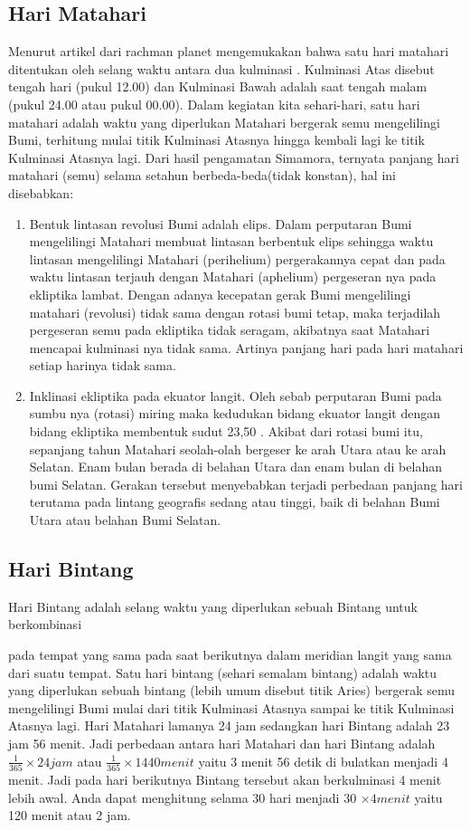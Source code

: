\subsection{Hari Matahari}
 Menurut artikel dari rachman planet mengemukakan bahwa satu hari matahari ditentukan
 oleh selang waktu antara dua kulminasi \cite{rachmanplanet}. Kulminasi Atas disebut tengah hari (pukul 12.00)
 dan Kulminasi Bawah adalah saat tengah malam (pukul 24.00 atau pukul 00.00). 
 Dalam kegiatan kita sehari-hari, satu hari matahari adalah waktu yang diperlukan
 Matahari bergerak semu mengelilingi Bumi, terhitung mulai titik Kulminasi Atasnya
 hingga kembali lagi ke titik Kulminasi Atasnya lagi. Dari hasil pengamatan Simamora, ternyata 
 panjang hari matahari (semu) selama setahun berbeda-beda(tidak konstan), 
 hal ini disebabkan:
 \begin{enumerate}
 \item Bentuk lintasan revolusi Bumi adalah elips.
 Dalam perputaran Bumi mengelilingi Matahari membuat lintasan berbentuk elips 
 sehingga waktu lintasan mengelilingi Matahari (perihelium) 
 pergerakannya cepat dan pada waktu lintasan terjauh 
 dengan Matahari (aphelium) pergeseran nya pada ekliptika lambat. 
 Dengan adanya kecepatan gerak Bumi mengelilingi matahari (revolusi)
 tidak sama dengan rotasi bumi tetap, maka terjadilah pergeseran semu
 pada ekliptika tidak seragam, akibatnya saat Matahari mencapai 
 kulminasi nya tidak sama. Artinya panjang hari pada hari matahari 
 setiap harinya tidak sama.
 
 \item	Inklinasi ekliptika pada ekuator langit.
 Oleh sebab perputaran Bumi pada sumbu nya (rotasi) miring maka kedudukan
 bidang ekuator langit dengan bidang ekliptika membentuk sudut 23,50 .
 Akibat dari rotasi bumi itu, sepanjang tahun Matahari seolah-olah bergeser ke arah
 Utara atau ke arah Selatan. Enam bulan berada di belahan Utara dan 
 enam bulan di belahan bumi Selatan. Gerakan tersebut menyebabkan 
 terjadi perbedaan panjang hari terutama pada lintang geografis sedang
 atau tinggi, baik di belahan Bumi Utara atau belahan Bumi Selatan.
 \end{enumerate}
\subsection{Hari Bintang}

Hari Bintang adalah selang waktu yang diperlukan sebuah Bintang untuk berkombinasi 

 pada tempat yang sama pada saat berikutnya dalam meridian langit yang 
 sama dari suatu tempat. Satu hari bintang (sehari semalam bintang) adalah 
 waktu yang diperlukan sebuah bintang (lebih umum disebut titik Aries) bergerak semu
 mengelilingi Bumi mulai dari titik Kulminasi Atasnya sampai ke titik Kulminasi Atasnya 
 lagi. Hari Matahari lamanya 24 jam sedangkan hari Bintang adalah 23 jam 56 menit. 
 Jadi perbedaan antara hari Matahari dan  hari Bintang adalah $\frac{1}{365}\times 24 jam$ atau 
 $\frac{1}{365}\times 1440 menit$ yaitu 3 menit 56 detik di bulatkan menjadi 4 menit. 
 Jadi pada hari berikutnya Bintang tersebut akan berkulminasi 4 menit lebih awal.
 Anda dapat menghitung selama 30 hari menjadi 30 $\times 4 menit$ yaitu 120 menit atau 2 jam. 

